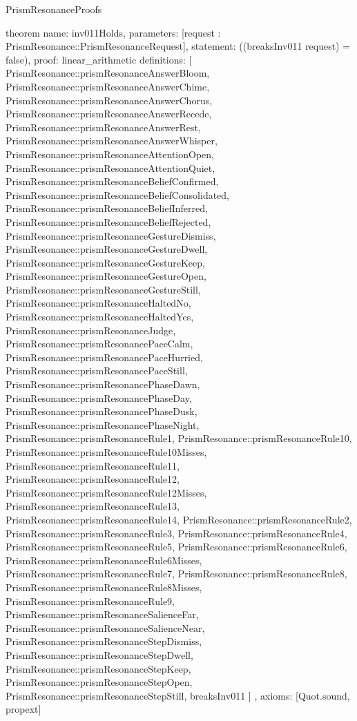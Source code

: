 \begin{lexlean}{PrismResonanceProofs}
\begin{semanticmodule}
theorem{
  name: inv011Holds,
  parameters: [request : PrismResonance::PrismResonanceRequest],
  statement: ((breaksInv011 request) = false),
  proof: linear_arithmetic{
    definitions: [
      PrismResonance::prismResonanceAnswerBloom,
      PrismResonance::prismResonanceAnswerChime,
      PrismResonance::prismResonanceAnswerChorus,
      PrismResonance::prismResonanceAnswerRecede,
      PrismResonance::prismResonanceAnswerRest,
      PrismResonance::prismResonanceAnswerWhisper,
      PrismResonance::prismResonanceAttentionOpen,
      PrismResonance::prismResonanceAttentionQuiet,
      PrismResonance::prismResonanceBeliefConfirmed,
      PrismResonance::prismResonanceBeliefConsolidated,
      PrismResonance::prismResonanceBeliefInferred,
      PrismResonance::prismResonanceBeliefRejected,
      PrismResonance::prismResonanceGestureDismiss,
      PrismResonance::prismResonanceGestureDwell,
      PrismResonance::prismResonanceGestureKeep,
      PrismResonance::prismResonanceGestureOpen,
      PrismResonance::prismResonanceGestureStill,
      PrismResonance::prismResonanceHaltedNo,
      PrismResonance::prismResonanceHaltedYes,
      PrismResonance::prismResonanceJudge,
      PrismResonance::prismResonancePaceCalm,
      PrismResonance::prismResonancePaceHurried,
      PrismResonance::prismResonancePaceStill,
      PrismResonance::prismResonancePhaseDawn,
      PrismResonance::prismResonancePhaseDay,
      PrismResonance::prismResonancePhaseDusk,
      PrismResonance::prismResonancePhaseNight,
      PrismResonance::prismResonanceRule1,
      PrismResonance::prismResonanceRule10,
      PrismResonance::prismResonanceRule10Misses,
      PrismResonance::prismResonanceRule11,
      PrismResonance::prismResonanceRule12,
      PrismResonance::prismResonanceRule12Misses,
      PrismResonance::prismResonanceRule13,
      PrismResonance::prismResonanceRule14,
      PrismResonance::prismResonanceRule2,
      PrismResonance::prismResonanceRule3,
      PrismResonance::prismResonanceRule4,
      PrismResonance::prismResonanceRule5,
      PrismResonance::prismResonanceRule6,
      PrismResonance::prismResonanceRule6Misses,
      PrismResonance::prismResonanceRule7,
      PrismResonance::prismResonanceRule8,
      PrismResonance::prismResonanceRule8Misses,
      PrismResonance::prismResonanceRule9,
      PrismResonance::prismResonanceSalienceFar,
      PrismResonance::prismResonanceSalienceNear,
      PrismResonance::prismResonanceStepDismiss,
      PrismResonance::prismResonanceStepDwell,
      PrismResonance::prismResonanceStepKeep,
      PrismResonance::prismResonanceStepOpen,
      PrismResonance::prismResonanceStepStill,
      breaksInv011
    ]
  },
  axioms: [Quot.sound, propext]
}


\end{semanticmodule}
\end{lexlean}
